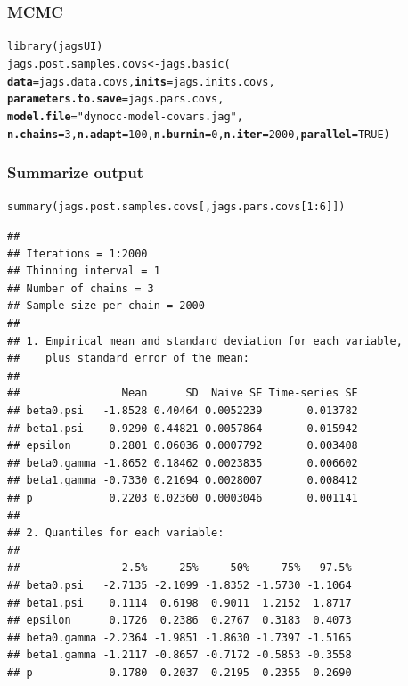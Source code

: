 \documentclass[color=usenames,dvipsnames]{beamer}\usepackage[]{graphicx}\usepackage[]{color}
\makeatletter
\newcommand{\hlnum}[1]{\textcolor[rgb]{0.69,0.494,0}{#1}}%
\newcommand{\hlstr}[1]{\textcolor[rgb]{0.749,0.012,0.012}{#1}}%
\newcommand{\hlopt}[1]{\textcolor[rgb]{0,0,0}{#1}}%
\newcommand{\hlstd}[1]{\textcolor[rgb]{0,0,0}{#1}}%
\newcommand{\hlkwb}[1]{\textcolor[rgb]{0,0.341,0.682}{#1}}%
\newcommand{\hlkwc}[1]{\textcolor[rgb]{0,0,0}{\textbf{#1}}}%
\newcommand{\hlkwd}[1]{\textcolor[rgb]{0.004,0.004,0.506}{#1}}%
\newenvironment{kframe}{%
 \def\at@end@of@kframe{}%
 \ifinner\ifhmode%
  \def\at@end@of@kframe{\end{minipage}}%
  \begin{minipage}{\columnwidth}%
 \fi\fi%
 \def\FrameCommand##1{\hskip\@totalleftmargin \hskip-\fboxsep
 \colorbox{shadecolor}{##1}\hskip-\fboxsep
     \hskip-\linewidth \hskip-\@totalleftmargin \hskip\columnwidth}%
 \MakeFramed {\advance\hsize-\width
   \@totalleftmargin\z@ \linewidth\hsize
   \@setminipage}}%
 {\par\unskip\endMakeFramed%
 \at@end@of@kframe}
\newenvironment{knitrout}{}{} %
\makeatother
\begin{document}
\begin{frame}[fragile]
  \frametitle{MCMC}
  \small
\begin{knitrout}\scriptsize
{}\color{fgcolor}\begin{kframe}
\begin{alltt}
\hlkwd{library}\hlstd{(jagsUI)}
\hlstd{jags.post.samples.covs} \hlkwb{<-} \hlkwd{jags.basic}\hlstd{(}
    \hlkwc{data}\hlstd{=jags.data.covs,} \hlkwc{inits}\hlstd{=jags.inits.covs,}
    \hlkwc{parameters.to.save}\hlstd{=jags.pars.covs,}
    \hlkwc{model.file}\hlstd{=}\hlstr{"dynocc-model-covars.jag"}\hlstd{,}
    \hlkwc{n.chains}\hlstd{=}\hlnum{3}\hlstd{,} \hlkwc{n.adapt}\hlstd{=}\hlnum{100}\hlstd{,} \hlkwc{n.burnin}\hlstd{=}\hlnum{0}\hlstd{,} \hlkwc{n.iter}\hlstd{=}\hlnum{2000}\hlstd{,} \hlkwc{parallel}\hlstd{=}\hlnum{TRUE}\hlstd{)}
\end{alltt}
\end{kframe}
\end{knitrout}
\end{frame}



\begin{frame}[fragile]
  \frametitle{Summarize output}
\begin{knitrout}\tiny
{}\color{fgcolor}\begin{kframe}
\begin{alltt}
\hlkwd{summary}\hlstd{(jags.post.samples.covs[,jags.pars.covs[}\hlnum{1}\hlopt{:}\hlnum{6}\hlstd{]])}
\end{alltt}
\begin{verbatim}
## 
## Iterations = 1:2000
## Thinning interval = 1 
## Number of chains = 3 
## Sample size per chain = 2000 
## 
## 1. Empirical mean and standard deviation for each variable,
##    plus standard error of the mean:
## 
##                Mean      SD  Naive SE Time-series SE
## beta0.psi   -1.8528 0.40464 0.0052239       0.013782
## beta1.psi    0.9290 0.44821 0.0057864       0.015942
## epsilon      0.2801 0.06036 0.0007792       0.003408
## beta0.gamma -1.8652 0.18462 0.0023835       0.006602
## beta1.gamma -0.7330 0.21694 0.0028007       0.008412
## p            0.2203 0.02360 0.0003046       0.001141
## 
## 2. Quantiles for each variable:
## 
##                2.5%     25%     50%     75%   97.5%
## beta0.psi   -2.7135 -2.1099 -1.8352 -1.5730 -1.1064
## beta1.psi    0.1114  0.6198  0.9011  1.2152  1.8717
## epsilon      0.1726  0.2386  0.2767  0.3183  0.4073
## beta0.gamma -2.2364 -1.9851 -1.8630 -1.7397 -1.5165
## beta1.gamma -1.2117 -0.8657 -0.7172 -0.5853 -0.3558
## p            0.1780  0.2037  0.2195  0.2355  0.2690
\end{verbatim}
\end{kframe}
\end{knitrout}
\end{frame}
\end{document}
